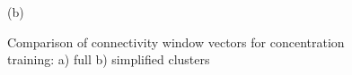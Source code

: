 \begin{figure}[h!]
\begin{minipage}[h]{0.5\linewidth}
 (b) \\
\end{minipage}
\caption{Comparison of connectivity window vectors for concentration training: a) full b) simplified clusters} 
\end{figure}

